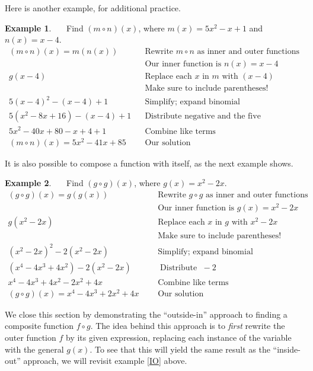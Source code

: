 \documentclass[12pt]{book}
\theoremstyle{definition}
\newtheorem{example}{Example}
\newcommand{\tmop}[1]{\ensuremath{\operatorname{#1}}}
\begin{document}
Here is another example, for additional practice.
\begin{example}~~~Find $(m\circ n)(x)$, where $m(x)=5x^2-x+1$ and $n(x)=x-4$.
  \begin{eqnarray*}
    (m \circ n) (x)=m(n (x)) &  & \text{Rewrite~} m\circ n \text{~as~inner~and~outer~functions}\\
	    &  & \text{Our~inner~function~is~} n(x) = x-4\\
    g (x-4) &  & \text{Replace~each~} x \text{~in~} m \text{~with~} (x-4)\\
		  &  & \text{Make~sure~to~include~parentheses!}\\
    5(x-4)^2 - (x-4)+1 &  & \tmop{Simplify;~expand~binomial}\\
    5(x^2-8x+16) - (x-4)+1 &  & \tmop{Distribute~negative~and~the~five}\\
    5x^2-40x+80 - x + 4+1~~ &  & \tmop{Combine~like~terms}\\
		(m \circ n) (x)=5x^2-41x+85~~~ &  & \text{Our solution}
	\end{eqnarray*}
\end{example}
It is also possible to compose a function with itself, as the next example shows.
	\begin{example}~~~Find $(g\circ g)(x)$, where $g(x)=x^2-2x$.
  \begin{eqnarray*}
    (g \circ g) (x)=g (g (x)) &  & \text{Rewrite~} g\circ g \text{~as~inner~and~outer~functions}\\
	    &  & \text{Our~inner~function~is~} g(x) = x^2-2x\\
    g (x^2-2x) &  & \text{Replace~each~} x \text{~in~} g \text{~with~} x^2-2x\\
		  &  & \text{Make~sure~to~include~parentheses!}\\
    (x^2-2x)^2 - 2(x^2-2x) &  & \tmop{Simplify;~expand~binomial}\\
    (x^4-4x^3+4x^2) - 2(x^2 -2x) &  & \tmop{Distribute~}-2\\
    x^4-4x^3+4x^2 - 2x^2 + 4x~~ &  & \tmop{Combine~like~terms}\\
		(g \circ g) (x)=x^4-4x^3+2x^2+4x~~~ &  & \text{Our solution}
	\end{eqnarray*}
\end{example}
We close this section by demonstrating the ``outside-in'' approach to finding a composite function $f\circ g$.  The idea behind this approach is to {\it first} rewrite the outer function $f$ by its given expression, replacing each instance of the variable with the general $g(x)$.  To see that this will yield the same result as the ``inside-out'' approach, we will revisit example \ref{IO} above.
\end{document}
